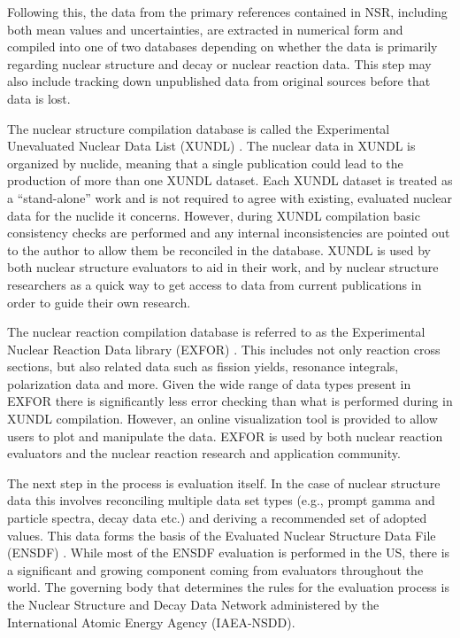 \documentclass[letterpaper]{ar-1col}
\begin{document}
Following this, the data from the primary references contained in NSR, including both mean values and uncertainties, are extracted in numerical form and compiled into one of two databases depending on whether the data is primarily regarding nuclear structure and decay or nuclear reaction data.
  This step may also include tracking down unpublished data from original sources before that data is lost.

The nuclear structure compilation database is called the Experimental Unevaluated Nuclear Data List (XUNDL) \cite{XUN}.
  The nuclear data in XUNDL is organized by nuclide, meaning that a single publication could lead to the production of more than one XUNDL dataset.
 Each XUNDL dataset is treated as a \enquote{stand-alone} work and is not required to agree with existing, evaluated nuclear data for the nuclide it concerns.
 However, during XUNDL compilation basic consistency checks are performed and any internal inconsistencies are pointed out to the author to allow them be reconciled in the database.
 XUNDL is used by both nuclear structure evaluators to aid in their work, and by nuclear structure researchers as a quick way to get access to data from current publications in order to guide their own research.


The nuclear reaction compilation database is referred to as the Experimental Nuclear Reaction Data library (EXFOR) \cite{EXF}.
 This includes not only reaction cross sections, but also related data such as fission yields, resonance integrals, polarization data and more.
 Given the wide range of data types present in EXFOR there is significantly less error checking than what is performed during in XUNDL compilation.
 However, an online visualization tool is provided to allow users to plot and manipulate the data.
EXFOR is used by both nuclear reaction evaluators and the nuclear reaction research and application community.


The next step in the process is evaluation itself.
 In the case of nuclear structure data this involves reconciling multiple data set types (e.g., prompt gamma and particle spectra, decay data etc.) and deriving a recommended set of adopted values.
 This data forms the basis of the Evaluated Nuclear Structure Data File (ENSDF) \cite{tepel1984ensdf}.
 While most of the ENSDF evaluation is performed in the US, there is a significant and growing component coming from evaluators throughout the world.
 The governing body that determines the rules for the evaluation process is the Nuclear Structure and Decay Data Network administered by the International Atomic Energy Agency (IAEA-NSDD).
 
\end{document}
